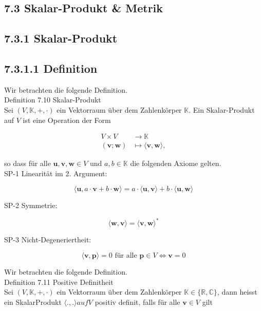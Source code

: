 \documentclass[10pt]{article}
\begin{document}
\subsection*{7.3 Skalar-Produkt \& Metrik}
\subsection*{7.3.1 Skalar-Produkt}
\subsection*{7.3.1.1 Definition}
Wir betrachten die folgende Definition.\\
Definition 7.10 Skalar-Produkt\\
Sei $(V, \mathbb{K},+, \cdot)$ ein Vektorraum über dem Zahlenkörper $\mathbb{K}$. Ein Skalar-Produkt auf $V$ ist eine Operation der Form


\begin{align*}
V \times V & \rightarrow \mathbb{K} \\
(\mathbf{v} ; \mathbf{w}) & \mapsto\langle\mathbf{v}, \mathbf{w}\rangle, \tag{7.48}
\end{align*}


so dass für alle $\mathbf{u}, \mathbf{v}, \mathbf{w} \in V$ und $a, b \in \mathbb{K}$ die folgenden Axiome gelten.\\
SP-1 Linearität im 2. Argument:


\begin{equation*}
\langle\mathbf{u}, a \cdot \mathbf{v}+b \cdot \mathbf{w}\rangle=a \cdot\langle\mathbf{u}, \mathbf{v}\rangle+b \cdot\langle\mathbf{u}, \mathbf{w}\rangle \tag{7.49}
\end{equation*}


SP-2 Symmetrie:


\begin{equation*}
\langle\mathbf{w}, \mathbf{v}\rangle=\langle\mathbf{v}, \mathbf{w}\rangle^{*} \tag{7.50}
\end{equation*}


SP-3 Nicht-Degeneriertheit:


\begin{equation*}
\langle\mathbf{v}, \mathbf{p}\rangle=0 \text { für alle } \mathbf{p} \in V \Leftrightarrow \mathbf{v}=0 \tag{7.51}
\end{equation*}


Wir betrachten die folgende Definition.\\
Definition 7.11 Positive Definitheit\\
Sei $(V, \mathbb{K},+, \cdot)$ ein Vektorraum über dem Zahlenkörper $\mathbb{K} \in\{\mathbb{R}, \mathbb{C}\}$, dann heisst ein SkalarProdukt $\langle.,$.$\rangle auf V$ positiv definit, falls für alle $\mathbf{v} \in V$ gilt
\end{document}
